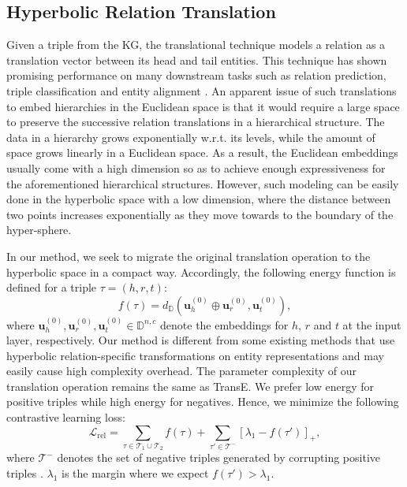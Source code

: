 \documentclass[11pt,a4paper]{article}
\begin{document}
\subsection{Hyperbolic Relation Translation}
\label{sect:translation}
Given a triple from the KG, the translational technique \cite{TransE} models a relation as a translation vector between its head and tail entities. This technique has shown promising performance on many downstream tasks such as relation prediction, triple classification and entity alignment \cite{TransE,MTransE,TransEdge}. An apparent issue of such translations to embed hierarchies in the Euclidean space is that it would require a large space to preserve the successive relation translations in a hierarchical structure. The data in a hierarchy grows exponentially w.r.t. its levels, while the amount of space grows linearly in a Euclidean space. As a result, the Euclidean embeddings usually come with a high dimension so as to achieve enough expressiveness for the aforementioned hierarchical structures. However, such modeling can be easily done in the hyperbolic space with a low dimension, where the distance between two points increases exponentially as they move towards to the boundary of the hyper-sphere. 

In our method, we seek to migrate the original translation operation to the hyperbolic space in a compact way. Accordingly, the following energy function is defined for a triple $\tau=(h,r,t)$:
\begin{equation}\label{relation_score}
  f(\tau)=d_{\mathbb{D}}(\mathbf{u}_h^{(0)} \oplus \mathbf{u}_r^{(0)},\mathbf{u}_t^{(0)}),
\end{equation}
where $\mathbf{u}_h^{(0)},\mathbf{u}_r^{(0)},\mathbf{u}_t^{(0)}\in \mathbb{D}^{n,c}$ denote the embeddings for $h$, $r$ and $t$ at the input layer, respectively. Our method is different from some existing methods \cite{PoincareKG,HyperKG} that use hyperbolic relation-specific transformations on entity representations and may easily cause high complexity overhead. The parameter complexity of our translation operation remains the same as TransE. We prefer low energy for positive triples while high energy for negatives. Hence, we minimize the following contrastive learning loss:
\begin{equation}
  \label{eq:hyperTransE_loss}
  \mathcal{L}_{\text{rel}}=\sum_{\tau\in\mathcal{T}_1\cup\mathcal{T}_2}f(\tau) + \sum_{\tau'\in\mathcal{T}^-}[\lambda_1 - f(\tau')]_+,
\end{equation}
where $\mathcal{T}^-$ denotes the set of negative triples generated by corrupting positive triples \cite{BootEA}. $\lambda_1$ is the margin where we expect $f(\tau')>\lambda_1$. 
\end{document}
